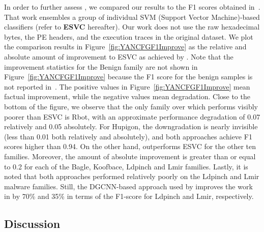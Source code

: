 In order to further assess \sysname, we compared our results to the F1 scores obtained in~\cite{YanDataset}.
That work ensembles a group of individual SVM (Support Vector Machine)-based classifiers (refer to \textbf{ESVC} hereafter). Our work does not use the raw hexadecimal bytes, the PE headers, and the execution traces in the original dataset.%
We plot the comparison results in Figure~\ref{fig:YANCFGF1Improve} as the relative and absolute amount of improvement to ESVC as achieved by \sysname.
Note that the improvement statistics for the Benign family are not shown in Figure~\ref{fig:YANCFGF1Improve} because the F1 score for the benign samples is not reported in~\cite{YanDataset}.
The positive values in Figure~\ref{fig:YANCFGF1Improve} mean factual improvement, while the negative values mean degradation.
Close to the bottom of the figure, we observe that the only family over which \sysname performs visibly poorer than ESVC is Rbot, with an approximate performance degradation of 0.07 relatively and 0.05 absolutely.
For Hupigon, the downgradation is nearly invisible (less than 0.01 both relatively and absolutely), and both approaches achieve F1 scores higher than 0.94.
On the other hand, \sysname outperforms ESVC for the other ten families.
Moreover, the amount of absolute improvement is greater than or equal to 0.2 for each of the Bagle, Koofbace, Ldpinch and Lmir families.
Lastly, it is noted that both approaches performed relatively poorly on the Ldpinch and Lmir malware families. Still, the DGCNN-based approach used by \sysname improves the work in \cite{YanDataset} by 70\% and 35\% in terms of the F1-score for Ldpinch and Lmir, respectively.


\subsection{Discussion}

